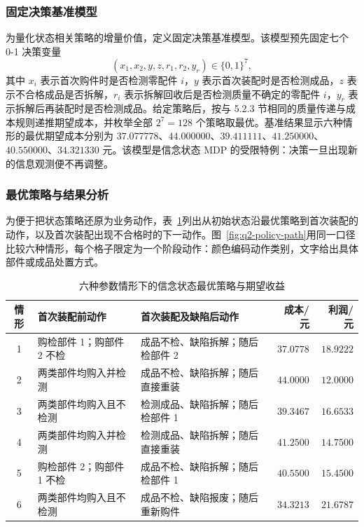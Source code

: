 \subsubsection{固定决策基准模型}

为量化状态相关策略的增量价值，定义固定决策基准模型。该模型预先固定七个 0-1 决策变量
\begin{equation}
  (x_1,x_2,y,z,r_1,r_2,y_r)\in\{0,1\}^7,
  \label{eq:q2-fixed-strategy}
\end{equation}
其中 $x_i$ 表示首次购件时是否检测零配件 $i$，$y$ 表示首次装配时是否检测成品，$z$ 表示不合格成品是否拆解，$r_i$ 表示拆解回收后是否检测质量不确定的零配件 $i$，$y_r$ 表示拆解后再装配时是否检测成品。给定策略后，按与 5.2.3 节相同的质量传递与成本规则递推期望成本，并枚举全部 $2^7=128$ 个策略取最优。基准结果显示六种情形的最优期望成本分别为 $37.077778$、$44.000000$、$39.411111$、$41.250000$、$40.550000$、$34.321330$ 元。该模型是信念状态 MDP 的受限特例：决策一旦出现新的信息观测便不再调整。

\subsubsection{最优策略与结果分析}

为便于把状态策略还原为业务动作，表~\ref{tab:q2-best-policies}列出从初始状态沿最优策略到首次装配的动作，以及首次装配出现不合格时的下一动作。图~\ref{fig:q2-policy-path}用同一口径比较六种情形，每个格子限定为一个阶段动作：颜色编码动作类别，文字给出具体部件或成品处置方式。

\begin{table}[H]
  \centering
  \caption{六种参数情形下的信念状态最优策略与期望收益}
  \label{tab:q2-best-policies}
  \begin{tabular}{c>{\raggedright\arraybackslash}p{}>{\raggedright\arraybackslash}p{}rr}
    \toprule
    情形 & 首次装配前动作 & 首次装配及缺陷后动作 & 成本/元 & 利润/元 \\
    \midrule
    1 & 购检部件 1；购部件 2 不检 & 成品不检、缺陷拆解；随后检部件 2 & $37.0778$ & $18.9222$ \\
    2 & 两类部件均购入并检测 & 成品不检、缺陷拆解；随后直接重装 & $44.0000$ & $12.0000$ \\
    3 & 两类部件均购入且不检测 & 检测成品、缺陷拆解；随后检部件 1 & $39.3467$ & $16.6533$ \\
    4 & 两类部件均购入并检测 & 检测成品、缺陷拆解；随后直接重装 & $41.2500$ & $14.7500$ \\
    5 & 购检部件 2；购部件 1 不检 & 成品不检、缺陷拆解；随后检部件 1 & $40.5500$ & $15.4500$ \\
    6 & 两类部件均购入且不检测 & 成品不检、缺陷报废；随后重新购件 & $34.3213$ & $21.6787$ \\
    \bottomrule
  \end{tabular}
\end{table}

